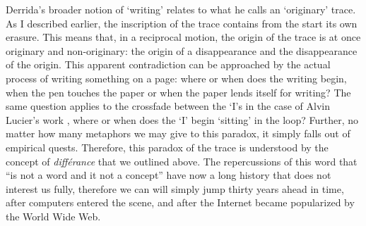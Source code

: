 Derrida's broader notion of `writing' relates to what he calls an `originary' trace. As I described earlier, the inscription of the trace contains from the start its own erasure. This means that, in a reciprocal motion, the origin of the trace is at once originary and non-originary: the origin of a disappearance and the disappearance of the origin. This apparent contradiction can be approached by the actual process of writing something on a page: where or when does the writing begin, when the pen touches the paper or when the paper lends itself for writing? The same question applies to the crossfade between the `I's in the case of Alvin Lucier's work , where or when does the `I' begin `sitting' in the loop? Further, no matter how many metaphors we may give to this paradox, it simply falls out of empirical quests. Therefore, this paradox of the trace is understood by the concept of \textit{différance} that we outlined above. The repercussions of this word that ``is not a word and it not a concept'' have now a long history that does not interest us fully, therefore we can will simply jump thirty years ahead in time, after computers entered the scene, and after the Internet became popularized by the World Wide Web.

